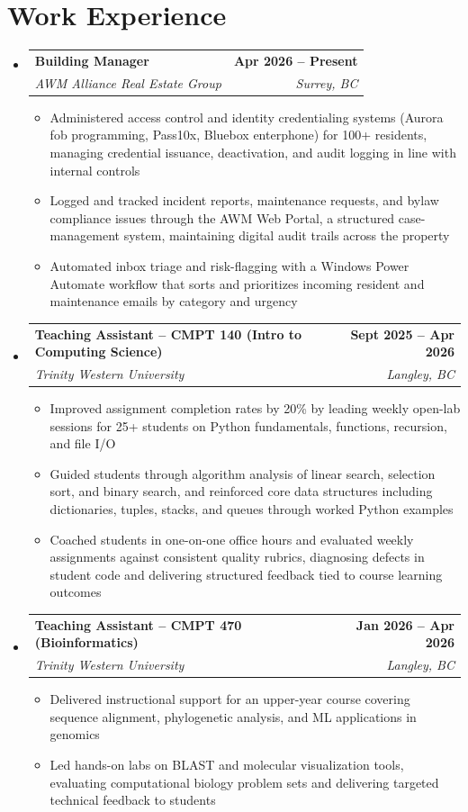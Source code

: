 \documentclass[letterpaper,10pt]{article}
\makeatletter
\newcommand{\resumeItem}[1]{\item\small{#1 \vspace{-2pt}}}
\newcommand{\resumeSubheading}[4]{%
  \vspace{-2pt}\item[]
    \begin{tabular*}{1.0\textwidth}[t]{l@{\extracolsep{\fill}}r}
      \textbf{#1} & \textbf{\small #2} \\
      \textit{\small #3} & \textit{\small #4} \\
    \end{tabular*}\vspace{-4pt}
}
\newcommand{\resumeSubHeadingListStart}{\begin{itemize}[leftmargin=0in, itemsep=0pt]}
\newcommand{\resumeSubHeadingListEnd}{\end{itemize}}
\newcommand{\resumeItemListStart}{\begin{itemize}[leftmargin=0.18in, label=\raisebox{0.2ex}{\scriptsize\textbullet}, itemsep=0pt, topsep=4pt]}
\newcommand{\resumeItemListEnd}{\end{itemize}\vspace{-2pt}}
\makeatother
\begin{document}
\section{Work Experience}
\resumeSubHeadingListStart
\resumeSubheading
  {Building Manager}{Apr 2026 -- Present}
  {AWM Alliance Real Estate Group}{Surrey, BC}
\resumeItemListStart
    \resumeItem{Administered access control and identity credentialing systems (Aurora fob programming, Pass10x, Bluebox enterphone) for 100+ residents, managing credential issuance, deactivation, and audit logging in line with internal controls}
    \resumeItem{Logged and tracked incident reports, maintenance requests, and bylaw compliance issues through the AWM Web Portal, a structured case-management system, maintaining digital audit trails across the property}
    \resumeItem{Automated inbox triage and risk-flagging with a Windows Power Automate workflow that sorts and prioritizes incoming resident and maintenance emails by category and urgency}
\resumeItemListEnd
\resumeSubheading
  {Teaching Assistant -- CMPT 140 (Intro to Computing Science)}{Sept 2025 -- Apr 2026}
  {Trinity Western University}{Langley, BC}
\resumeItemListStart
    \resumeItem{Improved assignment completion rates by 20\% by leading weekly open-lab sessions for 25+ students on Python fundamentals, functions, recursion, and file I/O}
    \resumeItem{Guided students through algorithm analysis of linear search, selection sort, and binary search, and reinforced core data structures including dictionaries, tuples, stacks, and queues through worked Python examples}
    \resumeItem{Coached students in one-on-one office hours and evaluated weekly assignments against consistent quality rubrics, diagnosing defects in student code and delivering structured feedback tied to course learning outcomes}
\resumeItemListEnd
\resumeSubheading
  {Teaching Assistant -- CMPT 470 (Bioinformatics)}{Jan 2026 -- Apr 2026}
  {Trinity Western University}{Langley, BC}
\resumeItemListStart
    \resumeItem{Delivered instructional support for an upper-year course covering sequence alignment, phylogenetic analysis, and ML applications in genomics}
    \resumeItem{Led hands-on labs on BLAST and molecular visualization tools, evaluating computational biology problem sets and delivering targeted technical feedback to students}
\resumeItemListEnd
\resumeSubHeadingListEnd
\vspace{-9pt}
\end{document}
